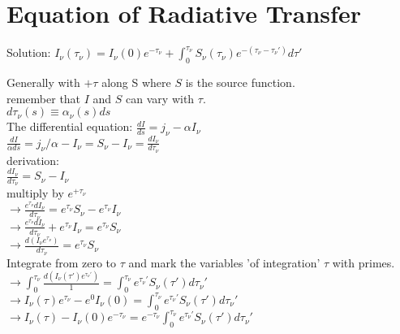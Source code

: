 \documentclass[12pt]{report}
\begin{document}
 \section{Equation of Radiative Transfer}
 
 Solution:
 \( \boxed{I_\nu(\tau_\nu)=I_\nu(0)e^{-\tau_\nu}+\int_0^{\tau_\nu} S_\nu(\tau_\nu)e^{-(\tau_\nu-\tau_\nu')}d\tau' } \)
 
 
Generally with $+\tau$ along S where $S$ is the source function.\\
 remember that $I$ and $S$ can vary with $\tau$.\\
 \( d\tau_\nu(s)\equiv \alpha_\nu(s)ds\) \\
 
 The differential equation:
 \(\boxed{\frac{dI}{ds}=j_\nu-\alpha I_\nu }\) \\
 
 \(\frac{dI}{\alpha ds}=j_\nu/\alpha-I_\nu =S_\nu-I_\nu=\frac{dI_\nu}{d\tau_\nu} \) \\
derivation: \\
\( \frac{dI_\nu}{d\tau_\nu} = S_\nu-I_\nu \) \\
multiply by $e^{+\tau_\nu}$\\
\(\rightarrow \frac{e^{\tau_\nu}dI_\nu}{d\tau_\nu} = e^{\tau_\nu}S_\nu-e^{\tau_\nu} I_\nu \) \\
\(\rightarrow \frac{e^{\tau_\nu}dI_\nu}{d\tau_\nu} + e^{\tau_\nu} I_\nu = e^{\tau_\nu}S_\nu \) \\
\(\rightarrow \frac{d(I_\nu e^{\tau_\nu})}{d\tau_\nu} = e^{\tau_\nu}S_\nu \) \\ 
Integrate from zero to $\tau$ and mark the variables 'of integration' $\tau$ with primes.\\
\(\rightarrow \int_0^{\tau_\nu} \frac{d(I_\nu(\tau') e^{\tau_\nu'})}{1} =  \int_0^{\tau_\nu} e^{\tau_\nu'}S_\nu(\tau') d\tau_\nu'\) \\
\(\rightarrow I_\nu(\tau) e^{\tau_\nu} -e^0 I_\nu(0) =  \int_0^{\tau_\nu} e^{\tau_\nu'}S_\nu(\tau') d\tau_\nu'\) \\
\(\rightarrow I_\nu(\tau) -  I_\nu(0)e^{-\tau_\nu}  = e^{-\tau_\nu}  \int_0^{\tau_\nu} e^{\tau_\nu'}S_\nu(\tau') d\tau_\nu'\) \\
\end{document}
